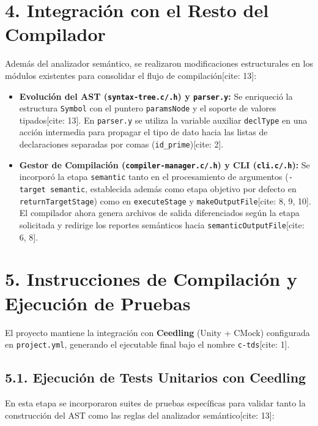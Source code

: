 \documentclass[12pt, a4paper]{article}
\begin{document}
\section{4. Integración con el Resto del Compilador}
Además del analizador semántico, se realizaron modificaciones estructurales en los módulos existentes para consolidar el flujo de compilación[cite: 13]:

\begin{itemize}
    \item \textbf{Evolución del AST (\texttt{syntax-tree.c/.h}) y \texttt{parser.y}:} Se enriqueció la estructura \texttt{Symbol} con el puntero \texttt{paramsNode} y el soporte de valores tipados[cite: 13]. En \texttt{parser.y} se utiliza la variable auxiliar \texttt{declType} en una acción intermedia para propagar el tipo de dato hacia las listas de declaraciones separadas por comas (\texttt{id\_prime})[cite: 2].
    \item \textbf{Gestor de Compilación (\texttt{compiler-manager.c/.h}) y CLI (\texttt{cli.c/.h}):} Se incorporó la etapa \texttt{semantic} tanto en el procesamiento de argumentos (\texttt{-target semantic}, establecida además como etapa objetivo por defecto en \texttt{returnTargetStage}) como en \texttt{executeStage} y \texttt{makeOutputFile}[cite: 8, 9, 10]. El compilador ahora genera archivos de salida diferenciados según la etapa solicitada y redirige los reportes semánticos hacia \texttt{semanticOutputFile}[cite: 6, 8].
\end{itemize}

\section{5. Instrucciones de Compilación y Ejecución de Pruebas}
El proyecto mantiene la integración con \textbf{Ceedling} (Unity + CMock) configurada en \texttt{project.yml}, generando el ejecutable final bajo el nombre \texttt{c-tds}[cite: 1].

\subsection*{5.1. Ejecución de Tests Unitarios con Ceedling}
En esta etapa se incorporaron suites de pruebas específicas para validar tanto la construcción del AST como las reglas del analizador semántico[cite: 13]:
\end{document}
